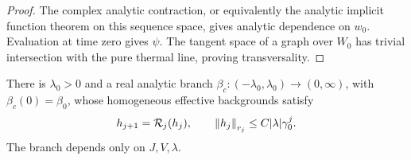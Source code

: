 \begin{proof}
The complex analytic contraction, or
equivalently the analytic implicit function theorem on this sequence
space, gives analytic dependence on $w_0$.  Evaluation at time zero
gives $\psi$.  The tangent space of a graph over $W_0$ has trivial
intersection with the pure thermal line, proving transversality.
\end{proof}

\begin{proposition}\label{flow:branch}
There is $\lambda_0>0$ and a real analytic branch
$\beta_c:(-\lambda_0,\lambda_0)\to(0,\infty)$, with
$\beta_c(0)=\beta_0$, whose homogeneous effective backgrounds satisfy
\begin{equation}\label{flow:plane-decay}
       h_{j+1}=\mathcal R_j(h_j),\qquad
       \left\|h_j\right\|_{r_j}\le C|\lambda|\gamma_0^j.
\end{equation}
The branch depends only on $J,V,\lambda$.
\end{proposition}

